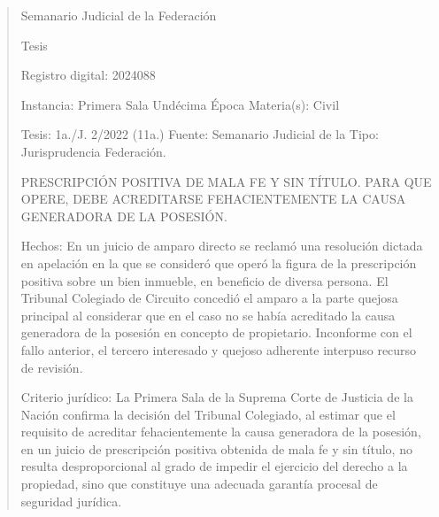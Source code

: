 \documentclass[11pt,a4paper]{article}
\begin{document}
\begin{quote}
                                                   Semanario Judicial de la Federación

                                               Tesis

 Registro digital: 2024088

 Instancia: Primera Sala           Undécima Época                       Materia(s): Civil

 Tesis: 1a./J. 2/2022 (11a.)       Fuente: Semanario Judicial de la     Tipo: Jurisprudencia
                                   Federación.


PRESCRIPCIÓN POSITIVA DE MALA FE Y SIN TÍTULO. PARA QUE OPERE, DEBE
ACREDITARSE FEHACIENTEMENTE LA CAUSA GENERADORA DE LA POSESIÓN.


Hechos: En un juicio de amparo directo se reclamó una resolución dictada en apelación en la que se
consideró que operó la figura de la prescripción positiva sobre un bien inmueble, en beneficio de
diversa persona. El Tribunal Colegiado de Circuito concedió el amparo a la parte quejosa principal al
considerar que en el caso no se había acreditado la causa generadora de la posesión en concepto
de propietario. Inconforme con el fallo anterior, el tercero interesado y quejoso adherente interpuso
recurso de revisión.

Criterio jurídico: La Primera Sala de la Suprema Corte de Justicia de la Nación confirma la decisión
del Tribunal Colegiado, al estimar que el requisito de acreditar fehacientemente la causa generadora
de la posesión, en un juicio de prescripción positiva obtenida de mala fe y sin título, no resulta
desproporcional al grado de impedir el ejercicio del derecho a la propiedad, sino que constituye una
adecuada garantía procesal de seguridad jurídica.


\end{quote}
\end{document}
